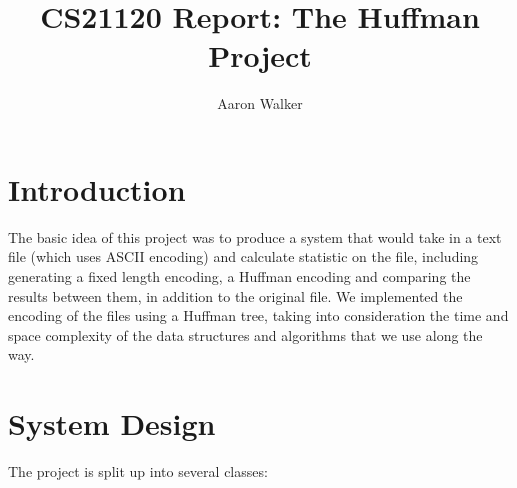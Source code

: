 \documentclass[11pt, oneside]{amsart}
\title{CS21120 Report: The Huffman Project}
\author{Aaron Walker}
\begin{document}
\maketitle
\section{Introduction}
The basic idea of this project was to produce a system that would take in a text file (which uses ASCII encoding) and calculate statistic on the file, including generating a fixed length encoding, a Huffman encoding and comparing the results between them, in addition to the original file. We implemented the encoding of the files using a Huffman tree, taking into consideration the time and space complexity of the data structures and algorithms that we use along the way.
\section{System Design}
	The project is split up into several classes:
\end{document}
